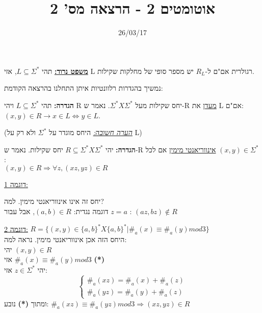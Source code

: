 \documentclass{article}
\begin{document}
\title{אוטומטים 2 - הרצאה מס' 2}
\date{26/03/17}
\author{}
\maketitle
\large
\textbf{\underline{משפט נרוד:}}
תהי
$L \subseteq{\Sigma^*}$,
אזי L רגולרית אם"ם ל-$R_{L}$ יש מספר סופי של מחלקות שקילות.

\setlength\parskip{\baselineskip}

נמשיך בהגדרות רלוונטיות איתן התחלנו בהרצאה הקודמת:

\setlength\parskip{\baselineskip}

\textbf{הגדרה:}
תהי $L \subseteq \Sigma^*$ ויהי R יחס שקילות מעל $\Sigma^*X \Sigma^*$. נאמר ש-R \underline{מעדן} את L אם"ם: $(x,y) \in R \rightarrow x \in L \Leftrightarrow y \in L$.

\setlength\parskip{\baselineskip}

(\emph{\underline{הערה חשובה:}} היחס מוגדר על $\Sigma^*$ ולא רק על L)

\setlength\parskip{\baselineskip}

\textbf{הגדרה:}
יהי
$R \subseteq{\Sigma^*X \Sigma^*}$
יחס שקילות. נאמר ש-R
\underline{אינווריאנטי מימין} אם לכל
$(x,y)\in \Sigma^*$ :\\
$(x,y)\in R \Rightarrow \forall z, (xz,yz)\in R$

\setlength\parskip{\baselineskip}

\underline{דוגמה 1:}

\setlength\parskip{\baselineskip}

\setlength\parskip{\baselineskip}

יחס זה אינו אינווריאנטי מימין. למה?\\
דוגמה נגדית: $(a,b) \in R$, אבל עבור $z=a$ : $(az,bz) \notin R$

\setlength\parskip{\baselineskip}

\underline{דוגמה 2:}
$R=\{(x,y)\in \{a,b\}^*X \{a,b\}^* | \#_{a}(x) \equiv \#_{a}(y)  mod 3\}$\\
היחס הזה אכן אינווריאנטי מימין. נראה למה:\\
יהי
$(x,y) \in R$\\
אזי
$\#_{a}(x) \equiv \#_{a}(y)  mod 3$     \textbf{(*)}\\
יהי
$z \in \Sigma^*$ אזי:
\begin{equation*}
	\left\{
	\begin{array}{rl}
	\#_{a}(xz) = \#_{a}(x) + \#_{a}(z) \\
	\#_{a}(yz) = \#_{a}(y) + \#_{a}(z)
	\end{array}\right.
\end{equation*}
ומתוך \textbf{(*)} נובע:
$\#_{a}(xz) \equiv \#_{a}(yz)  mod 3  \Rightarrow (xz,yz) \in R$
\end{document}
